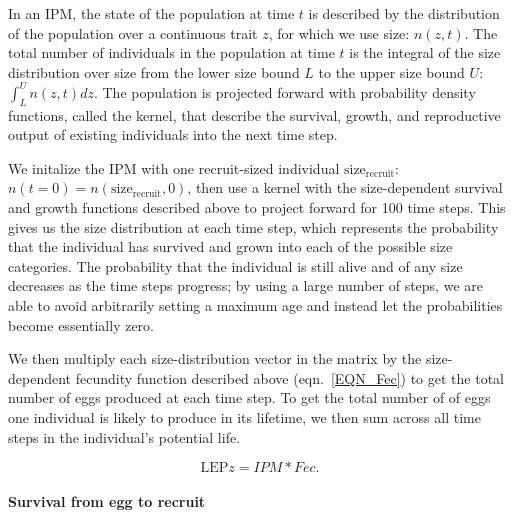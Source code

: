 \documentclass[12pt, oneside]{article}   	%
\begin{document}
In an IPM, the state of the population at time $t$ is described by the distribution of the population over a continuous trait $z$, for which we use size: $n(z,t)$. The total number of individuals in the population at time $t$ is the integral of the size distribution over size from the lower size bound $L$ to the upper size bound $U$: $\int_L^U n(z,t) dz$. The population is projected forward with probability density functions, called the kernel, that describe the survival, growth, and reproductive output of existing individuals into the next time step. 

We initalize the IPM with one recruit-sized individual $\text{size}_\text{recruit}$: $n(t=0) = n(\text{size}_\text{recruit}, 0)$, then use a kernel with the size-dependent survival and growth functions described above to project forward for 100 time steps. This gives us the size distribution at each time step, which represents the probability that the individual has survived and grown into each of the possible size categories. The probability that the individual is still alive and of any size decreases as the time steps progress; by using a large number of steps, we are able to avoid arbitrarily setting a maximum age and instead let the probabilities become essentially zero. 

We then multiply each size-distribution vector in the matrix by the size-dependent fecundity function described above (eqn.\ \ref{EQN_Fec}) to get the total number of eggs produced at each time step. To get the total number of of eggs one individual is likely to produce in its lifetime, we then sum across all time steps in the individual's potential life.  %

 
\begin{equation} %
\text{LEP}z = IPM * Fec. \label{EQN_LEP}
\end{equation}

\paragraph*{Survival from egg to recruit}
\end{document}
